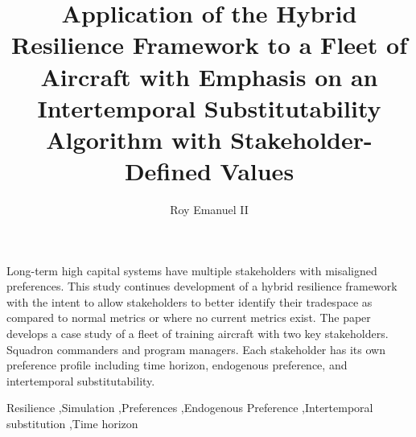 \documentclass[preprint,12pt]{elsarticle}
\begin{document}
\begin{frontmatter}


\title{Application of the Hybrid Resilience Framework to a Fleet of
  Aircraft with Emphasis on an Intertemporal Substitutability
  Algorithm with Stakeholder-Defined Values}




\author{Roy Emanuel II}

\address{Maryland, United States}

\begin{abstract}

\end{abstract}
Long-term high capital systems have multiple stakeholders with
misaligned preferences. This study continues development of a hybrid
resilience framework with the intent to allow stakeholders to better
identify their tradespace as compared to normal metrics or where no
current metrics exist. The paper develops a case study of a fleet of
training aircraft with two key stakeholders. Squadron commanders and
program managers. Each stakeholder has its own preference profile
including time horizon, endogenous preference, and intertemporal
substitutability. 

\begin{keyword}
Resilience \sep Simulation \sep Preferences \sep Endogenous Preference
\sep Intertemporal substitution \sep Time horizon


\end{keyword}

\end{frontmatter}
\end{document}
